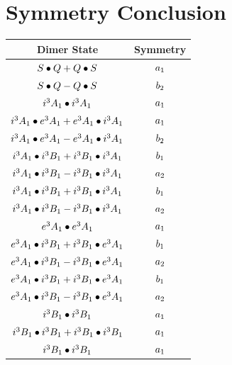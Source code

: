 \documentclass{article}
\begin{document}
\vspace{0.5cm}

\newpage
\newpage

\section{Symmetry Conclusion} 
\begin{table}[H]
\centering
\begin{tabular}{cc}
\hline
Dimer State & Symmetry \\[0.1cm] 
\hline
$S \bullet Q + Q \bullet S \displaystyle $ & $a_1 \displaystyle $ \\[0.1cm] 
$S \bullet Q - Q \bullet S \displaystyle $ & $b_2 \displaystyle $ \\[0.1cm] 
$i^3 A_1 \bullet i^3 A_1 \displaystyle $ & $a_1 \displaystyle $ \\[0.1cm] 
$i^3 A_1 \bullet e^3 A_1 + e^3 A_1 \bullet i^3 A_1 \displaystyle $ & $a_1 \displaystyle $ \\[0.1cm] 
$i^3 A_1 \bullet e^3 A_1 - e^3 A_1 \bullet i^3 A_1 \displaystyle $ & $b_2 \displaystyle $ \\[0.1cm] 
$i^3 A_1 \bullet i^3 B_{1} + i^3 B_{1} \bullet i^3 A_1 \displaystyle $ & $b_1 \displaystyle $ \\[0.1cm] 
$i^3 A_1 \bullet i^3 B_{1} - i^3 B_{1} \bullet i^3 A_1 \displaystyle $ & $a_2 \displaystyle $ \\[0.1cm] 
$i^3 A_1 \bullet i^3 B_{1} + i^3 B_{1} \bullet i^3 A_1 \displaystyle $ & $b_1 \displaystyle $ \\[0.1cm] 
$i^3 A_1 \bullet i^3 B_{1} - i^3 B_{1} \bullet i^3 A_1 \displaystyle $ & $a_2 \displaystyle $ \\[0.1cm] 
$e^3 A_1 \bullet e^3 A_1 \displaystyle $ & $a_1 \displaystyle $ \\[0.1cm] 
$e^3 A_1 \bullet i^3 B_{1} + i^3 B_{1} \bullet e^3 A_1 \displaystyle $ & $b_1 \displaystyle $ \\[0.1cm] 
$e^3 A_1 \bullet i^3 B_{1} - i^3 B_{1} \bullet e^3 A_1 \displaystyle $ & $a_2 \displaystyle $ \\[0.1cm] 
$e^3 A_1 \bullet i^3 B_{1} + i^3 B_{1} \bullet e^3 A_1 \displaystyle $ & $b_1 \displaystyle $ \\[0.1cm] 
$e^3 A_1 \bullet i^3 B_{1} - i^3 B_{1} \bullet e^3 A_1 \displaystyle $ & $a_2 \displaystyle $ \\[0.1cm] 
$i^3 B_{1} \bullet i^3 B_{1} \displaystyle $ & $a_1 \displaystyle $ \\[0.1cm] 
$i^3 B_{1} \bullet i^3 B_{1} + i^3 B_{1} \bullet i^3 B_{1} \displaystyle $ & $a_1 \displaystyle $ \\[0.1cm] 
$i^3 B_{1} \bullet i^3 B_{1} \displaystyle $ & $a_1 \displaystyle $ \\[0.1cm] 
\hline
\end{tabular}
\end{table}
\end{document}
